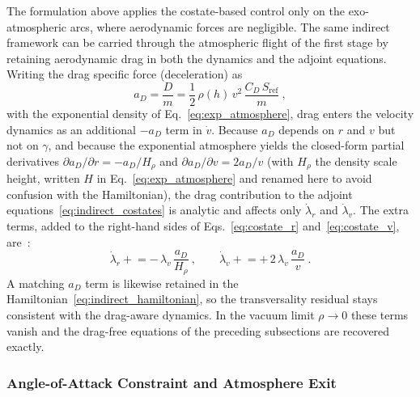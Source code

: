 The formulation above applies the costate-based control only on the exo-atmospheric arcs, where aerodynamic forces are negligible. The same indirect framework can be carried through the atmospheric flight of the first stage by retaining aerodynamic drag in both the dynamics and the adjoint equations. Writing the drag specific force (deceleration) as
\begin{equation}
a_D = \frac{D}{m} = \frac{1}{2}\,\rho(h)\,v^{2}\,\frac{C_D\,S_{\mathrm{ref}}}{m} \ ,
\label{eq:fa_drag}
\end{equation}
with the exponential density of Eq.~\eqref{eq:exp_atmosphere}, drag enters the velocity dynamics as an additional $-a_D$ term in $\dot{v}$. Because $a_D$ depends on $r$ and $v$ but not on $\gamma$, and because the exponential atmosphere yields the closed-form partial derivatives $\partial a_D/\partial r = -a_D/H_\rho$ and $\partial a_D/\partial v = 2a_D/v$ (with $H_\rho$ the density scale height, written $H$ in Eq.~\eqref{eq:exp_atmosphere} and renamed here to avoid confusion with the Hamiltonian), the drag contribution to the adjoint equations~\eqref{eq:indirect_costates} is analytic and affects only $\dot{\lambda}_r$ and $\dot{\lambda}_v$. The extra terms, added to the right-hand sides of Eqs.~\eqref{eq:costate_r} and~\eqref{eq:costate_v}, are~\cite{gath2001optimization}:
\begin{equation}
\dot{\lambda}_r \mathrel{+}= -\,\lambda_v\,\frac{a_D}{H_\rho} \ , \qquad
\dot{\lambda}_v \mathrel{+}= +\,2\,\lambda_v\,\frac{a_D}{v} \ .
\label{eq:fa_drag_adjoint}
\end{equation}
A matching $a_D$ term is likewise retained in the Hamiltonian~\eqref{eq:indirect_hamiltonian}, so the transversality residual stays consistent with the drag-aware dynamics. In the vacuum limit $\rho\to 0$ these terms vanish and the drag-free equations of the preceding subsections are recovered exactly.

\subsubsection{Angle-of-Attack Constraint and Atmosphere Exit}
\label{sssec:fa_alpha}

